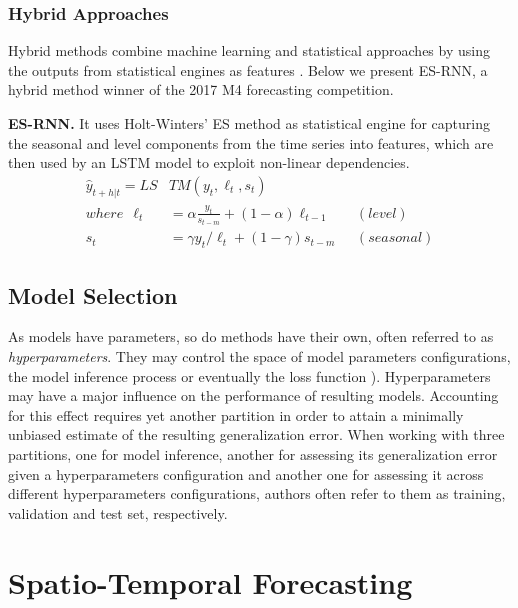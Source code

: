\subsubsection{Hybrid Approaches}
Hybrid methods combine machine learning and statistical approaches by using the outputs from statistical engines as features \cite{oreshkin2019nbeats}. Below we present ES-RNN, a hybrid method winner of the 2017 M4 forecasting competition.

\vspace{1em}
\noindent
\textbf{ES-RNN.} It uses Holt-Winters' ES method as statistical engine for capturing the seasonal and level components from the time series into features, which are then used by an LSTM model to exploit non-linear dependencies.
\begin{equation}\label{eq:esrnn}
    \begin{aligned}
    \hat{y}_{t+h|t} = LS&TM(y_t,\ell_t, s_t)\\
    where \ \ \ell_t &= \alpha \frac{y_t}{s_{t-m}} + (1-\alpha)\ell_{t-1}   &(level) \\
    s_t &= \gamma y_t/\ell_{t} + (1-\gamma)s_{t-m} \ \ \ &(seasonal)
    \end{aligned}
\end{equation}

\subsection{Model Selection}

As models have parameters, so do methods have their own, often referred to as \textit{hyperparameters}. They may control the space of model parameters configurations, the model inference process or eventually the loss function \cite{hutter2019automated}). Hyperparameters may have a major influence on the performance of resulting models. Accounting for this effect requires yet another partition in order to attain a minimally unbiased estimate of the resulting generalization error. When working with three partitions, one for model inference, another for assessing its generalization error given a hyperparameters configuration and another one for assessing it across different hyperparameters configurations, authors often refer to them as training, validation and test set, respectively.

\section{Spatio-Temporal Forecasting}\label{sec:stf}


